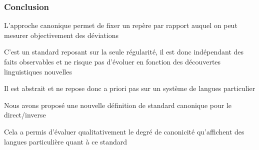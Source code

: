 
\begin{frame}
\frametitle{Conclusion}
\begin{wideitemize}%
\item[\highlightii{\lefthand}]  L'approche canonique permet de fixer
  un repère par rapport auquel on peut mesurer objectivement des déviations
\item C'est un standard reposant sur la seule régularité, il est donc
  indépendant des faits observables et ne risque pas d'évoluer en
  fonction des découvertes linguistiques nouvelles
\item Il est abstrait et ne repose donc a priori pas sur un système de
  langues particulier
\item[\highlightiv{\lefthand}] Nous avons proposé une nouvelle
  définition de standard canonique pour le direct/inverse
\item Cela a permis d'évaluer qualitativement le degré de canonicité
  qu'affichent des langues particulière quant à ce standard
\end{wideitemize}
\end{frame}

